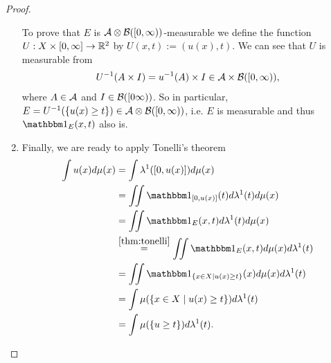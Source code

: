 \begin{proof}
\begin{enumerate}
		To prove that $E$ is $\mathcal{A} \otimes \mathcal{B}([0, \infty))$-measurable we define the function $U: X \times [0,\infty] \to \mathbb{R}^2$ by $U(x, t) := (u(x), t)$. We can see that $U$ is measurable from
		\begin{align*}
			{U}^{-1}(A \times I) = {u}^{-1}(A) \times I \in \mathcal{A} \times \mathcal{B}([0,\infty)),
		\end{align*}
		where $A \in \mathcal{A}$ and $I \in \mathcal{B}([0\infty))$. So in particular, $E = {U}^{-1}(\{u(x) \geq t\}) \in \mathcal{A} \otimes \mathcal{B}([0, \infty))$, i.e. $E$ is measurable and thus $\ind_E(x, t)$ also is.
		\item Finally, we are ready to apply Tonelli's theorem
		\begin{align*}
			\int u(x) d\mu(x)
			&= \int \lambda^1([0,u(x)])d\mu(x) \\
			&= \iint \ind_{[0, u(x)]}(t)d\lambda^1(t)d\mu(x) \\
			&= \iint \ind_E(x, t) d\lambda^1(t)d\mu(x)\\
			&\overset{\ref{thm:tonelli}}{=} \iint \ind_E(x,t) d\mu(x) d\lambda^1(t) \\
			&= \iint \ind_{\{x \in X \mid u(x) \geq t\}}(x)d\mu(x) d\lambda^1(t)\\
			&= \int \mu(\{x \in X \mid u(x) \geq t\}) d\lambda^1(t)\\
			&= \int \mu(\{u \geq t\})d\lambda^1(t).
		\end{align*}
	\end{enumerate}
\end{proof}
